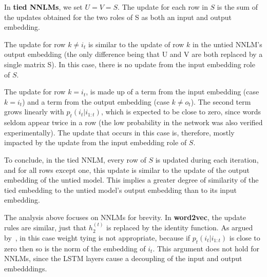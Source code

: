 \documentclass[11pt]{article}
\begin{document}
%
In {\bf tied NNLMs}, we set $U=V=S$. The update for each row in $S$  is the sum of the updates obtained for the two roles of S as both an input and output embedding.
%
%
%
%
%
%
%
%
%
%
%

The update for row $k \neq i_t$ is similar to the update of row $k$ in the untied NNLM's output embedding (the only difference being that U and V are both replaced by a single matrix S). 
In this case, there is no update from the input embedding role of $S$. 

The update for row $k=i_t$, is made up of a term from the input embedding (case $k=i_t$) and a term from the output embedding (case $ k \neq o_t$). The second term grows linearly with $p_t(i_t|i_{1:t})$, which is expected to be close to zero, since words seldom appear twice in a row (the low probability in the network was also verified experimentally). The update that occurs in this case is, therefore, mostly impacted by the update from the input embedding role of $S$.

%

To conclude, in the tied NNLM, every row of $S$ is updated during each iteration, and for all rows except one, this update is similar to the update of the output embedding of the untied model. This implies a greater degree of similarity of the tied embedding to the untied model's output embedding than to its input embedding. 

The analysis above focuses on NNLMs for brevity. In \textbf{word2vec}, the update rules are similar, just that $h_2^{(t)}$ is replaced by the identity function. As argued by~\cite{yg14}, in this case weight tying is not appropriate, because if $p_t(i_t|i_{1:t})$ is close to zero then so is the norm of the embedding of $i_t$. This argument does not hold for NNLMs, since the LSTM layers cause a decoupling of the input and output embedddings.  

%

%
%

%
%

%
%
%
%
%
%
%
%
%

%
%
%
%
%
%
%


%


%
%
%
%
%
%
%
%
%
%

%
\end{document}
